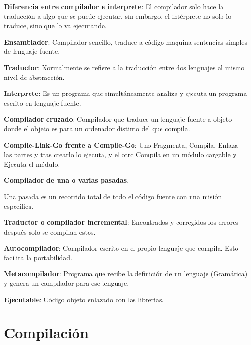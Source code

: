 \documentclass[12pt]{report} %
\begin{document}
\textbf{Diferencia entre compilador e interprete}: El compilador solo
hace la traducción a algo que se puede ejecutar, sin embargo, el
intérprete no solo lo traduce, sino que lo va ejecutando.

\textbf{Ensamblador}: Compilador sencillo, traduce a código maquina
sentencias simples de lenguaje fuente.

\textbf{Traductor}: Normalmente se refiere a la traducción entre dos
lenguajes al mismo nivel de abstracción.

\textbf{Interprete}: Es un programa que simultáneamente analiza y
ejecuta un programa escrito en lenguaje fuente.

\textbf{Compilador cruzado}: Compilador que traduce un lenguaje fuente a
objeto donde el objeto es para un ordenador distinto del que compila.

\textbf{Compile-Link-Go frente a Compile-Go}: Uno Fragmenta, Compila,
Enlaza las partes y tras crearlo lo ejecuta, y el otro Compila en un
módulo cargable y Ejecuta el módulo.

\textbf{Compilador de una o varias pasadas}.

Una pasada es un recorrido total de todo el código fuente con una misión
específica.

\textbf{Traductor o compilador incremental}: Encontrados y corregidos
los errores después solo se compilan estos.

\textbf{Autocompilador}: Compilador escrito en el propio lenguaje que
compila. Esto facilita la portabilidad.

\textbf{Metacompilador}: Programa que recibe la definición de un
lenguaje (Gramática) y genera un compilador para ese lenguaje.

\textbf{Ejecutable}: Código objeto enlazado con las librerías.


\section{Compilación}
\end{document}
